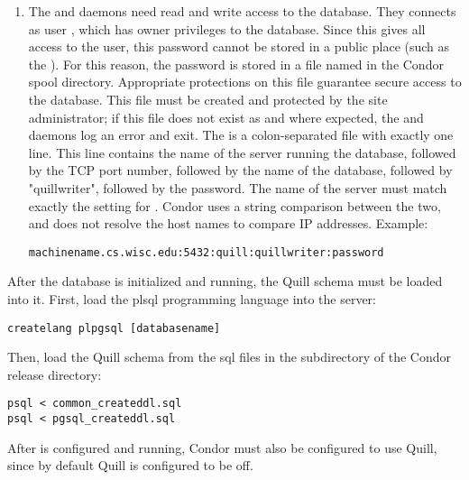 \begin{enumerate}
\item The  and  daemons need read and write access
to the database.
They connects as user ,
which has owner privileges to the database.
Since this gives all access to the  user,
this password cannot be stored in a public place 
(such as the ).
For this reason, the  password is stored
in a file named  in the Condor spool directory.
Appropriate protections on this file guarantee secure access to the database.
This file must be created and protected by the site administrator;
if this file does not exist as and where expected, the 
and  daemons log an error and exit.
The  is a colon-separated file
with exactly one line. 
This line contains the name of the server running
the database, followed by the TCP port number, followed by the
name of the database, followed by "quillwriter", followed by the password.
The name of the server must match exactly the setting for 
.
Condor uses a string comparison between the two, and does not resolve the
host names to compare IP addresses.
Example:
\begin{verbatim}
machinename.cs.wisc.edu:5432:quill:quillwriter:password
\end{verbatim}

\end{enumerate}

After the  database is initialized and running, 
the Quill schema
must be loaded into it.  First, load the plsql programming language
into the server:

\begin{verbatim}
createlang plpgsql [databasename]
\end{verbatim}

Then, load the Quill schema from the sql files in the  subdirectory
of the Condor release directory:

\begin{verbatim}
psql < common_createddl.sql
psql < pgsql_createddl.sql
\end{verbatim}


After  is configured and running, Condor must also be
configured to use Quill, since by default Quill is configured to be off.

